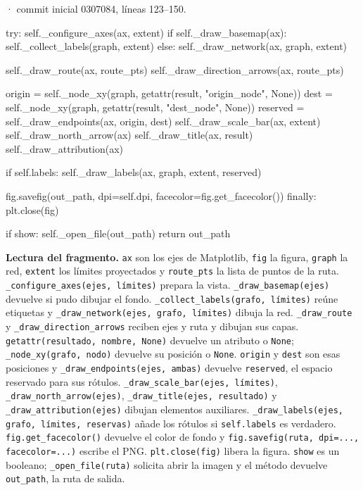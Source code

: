 \documentclass[11pt,a4paper]{article}
\begin{document}
\smallskip
{\footnotesize\texttt{} · commit inicial 0307084, líneas 123--150.}\par
\begin{Codigo}[firstnumber=123]
        try:
            self._configure_axes(ax, extent)
            if self._draw_basemap(ax):
                self._collect_labels(graph, extent)
            else:
                self._draw_network(ax, graph, extent)

            self._draw_route(ax, route_pts)
            self._draw_direction_arrows(ax, route_pts)

            origin = self._node_xy(graph, getattr(result, "origin_node", None))
            dest = self._node_xy(graph, getattr(result, "dest_node", None))
            reserved = self._draw_endpoints(ax, origin, dest)
            self._draw_scale_bar(ax, extent)
            self._draw_north_arrow(ax)
            self._draw_title(ax, result)
            self._draw_attribution(ax)

            if self.labels:
                self._draw_labels(ax, graph, extent, reserved)

            fig.savefig(out_path, dpi=self.dpi, facecolor=fig.get_facecolor())
        finally:
            plt.close(fig)

        if show:
            self._open_file(out_path)
        return out_path
\end{Codigo}

\textbf{Lectura del fragmento.} \texttt{ax} son los ejes de Matplotlib, \texttt{fig} la figura, \texttt{graph} la red, \texttt{extent} los límites proyectados y \texttt{route\_pts} la lista de puntos de la ruta. \texttt{\_configure\_axes(ejes, límites)} prepara la vista. \texttt{\_draw\_basemap(ejes)} devuelve si pudo dibujar el fondo. \texttt{\_collect\_labels(grafo, límites)} reúne etiquetas y \texttt{\_draw\_network(ejes, grafo, límites)} dibuja la red. \texttt{\_draw\_route} y \texttt{\_draw\_direction\_arrows} reciben ejes y ruta y dibujan sus capas. \texttt{getattr(resultado, nombre, None)} devuelve un atributo o \texttt{None}; \texttt{\_node\_xy(grafo, nodo)} devuelve su posición o \texttt{None}. \texttt{origin} y \texttt{dest} son esas posiciones y \texttt{\_draw\_endpoints(ejes, ambas)} devuelve \texttt{reserved}, el espacio reservado para sus rótulos. \texttt{\_draw\_scale\_bar(ejes, límites)}, \texttt{\_draw\_north\_arrow(ejes)}, \texttt{\_draw\_title(ejes, resultado)} y \texttt{\_draw\_attribution(ejes)} dibujan elementos auxiliares. \texttt{\_draw\_labels(ejes, grafo, límites, reservas)} añade los rótulos si \texttt{self.labels} es verdadero. \texttt{fig.get\_facecolor()} devuelve el color de fondo y \texttt{fig.savefig(ruta, dpi=..., facecolor=...)} escribe el PNG. \texttt{plt.close(fig)} libera la figura. \texttt{show} es un booleano; \texttt{\_open\_file(ruta)} solicita abrir la imagen y el método devuelve \texttt{out\_path}, la ruta de salida.
\end{document}
